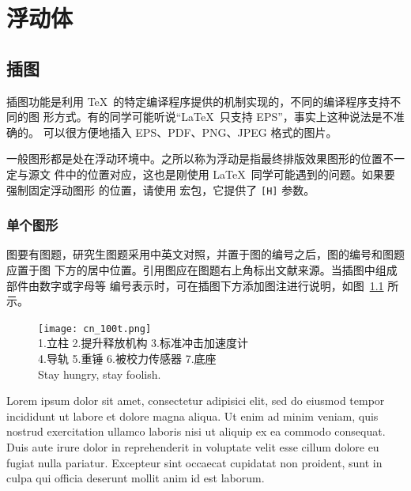 
\chapter{浮动体}

\section{插图}

插图功能是利用 \TeX\ 的特定编译程序提供的机制实现的，不同的编译程序支持不同的图
形方式。有的同学可能听说“\LaTeX\ 只支持 EPS”，事实上这种说法是不准确的。\XeTeX
可以很方便地插入 EPS、PDF、PNG、JPEG 格式的图片。

一般图形都是处在浮动环境中。之所以称为浮动是指最终排版效果图形的位置不一定与源文
件中的位置对应，这也是刚使用 \LaTeX\ 同学可能遇到的问题。如果要强制固定浮动图形
的位置，请使用  宏包，它提供了 \texttt{[H]} 参数。

\subsection{单个图形}

图要有图题，研究生图题采用中英文对照，并置于图的编号之后，图的编号和图题应置于图
下方的居中位置。引用图应在图题右上角标出文献来源。当插图中组成部件由数字或字母等
编号表示时，可在插图下方添加图注进行说明，如图~\ref{fig:cn_100t} 所示。

\begin{figure}[!htp]
  \centering
  \texttt{[image: cn\_100t.png]} \\
    1.立柱 2.提升释放机构 3.标准冲击加速度计 \\
    4.导轨 5.重锤 6.被校力传感器 7.底座 \\
    {Stay hungry, stay foolish.}
 \label{fig:cn_100t}
\end{figure}

Lorem ipsum dolor sit amet, consectetur adipisici elit, sed do eiusmod tempor
incididunt ut labore et dolore magna aliqua. Ut enim ad minim veniam, quis
nostrud exercitation ullamco laboris nisi ut aliquip ex ea commodo consequat.
Duis aute irure dolor in reprehenderit in voluptate velit esse cillum dolore eu
fugiat nulla pariatur. Excepteur sint occaecat cupidatat non proident, sunt in
culpa qui officia deserunt mollit anim id est laborum.

